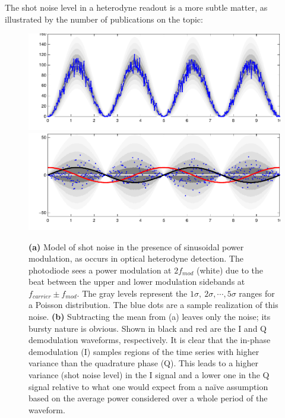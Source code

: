 The shot noise level in a heterodyne readout is a more subtle matter,
as illustrated by the number of publications on the topic:
\cite{Niebauer1991Nonstationary, Lyons2000Shot, Mio1992Observation, Meers1991Modulation, Buonanno2003Quantum}

\begin{figure}
\includegraphics[width=\columnwidth]{figures/cyclostationary-timeseries.pdf}
\includegraphics[width=\columnwidth]{figures/cyclostationary-timeseries2.pdf}
\caption[Illustration of cyclo-stationary shot noise]{\label{fig:cyclostationary-shot-noise} \textbf{(a)} Model of
  shot noise in the presence of sinusoidal power modulation, as occurs
  in optical heterodyne detection.  The photodiode sees a power
  modulation at $2f_{mod}$ (white) due to the beat between the upper
  and lower modulation sidebands at $f_{carrier} \pm f_{mod}$.
  The gray levels represent the $1\sigma,\ 2\sigma,
  \cdots, 5\sigma$ ranges for a Poisson distribution.  The blue dots
  are a sample realization of this noise. \textbf{(b)} Subtracting the
  mean from (a) leaves only the noise; its bursty nature is obvious.
  Shown in black and red are the I and Q demodulation waveforms,
  respectively.  It is clear that the in-phase demodulation (I)
  samples regions of the time series with higher variance than the
  quadrature phase (Q).  This leads to a higher variance (shot noise
  level) in the I signal and a lower one in the Q signal relative to
  what one would expect from a na\"ive assumption based on the average
  power considered over a whole period of the waveform.}
\end{figure}


